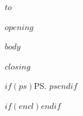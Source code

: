 \documentclass[
	pagenumber=false, %
	parskip=half, %
	foldmarks=true, %
	addrfield=true,
	fromphone=true,
	fromemail=true,
	fromurl=true,
	locfield=wide,
  enlargefirstpage=true
	]{scrlttr2}
\begin{document}
 
\begin{letter}{$to$} %


\opening{$opening$}

$body$

\closing{$closing$}

$if(ps)$\ps{$ps$}$endif$

$if(encl)$$endif$


\end{letter}
 
\end{document}

